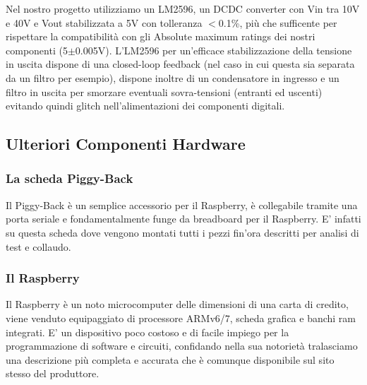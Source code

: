 \documentclass[10pt]{article}
\begin{document}
		Nel nostro progetto utilizziamo un LM2596, un DCDC converter con Vin tra 10V e 40V e Vout stabilizzata a 5V con tolleranza \(<\)0.1\%, più che sufficente per rispettare la compatibilità con gli Absolute maximum ratings dei nostri componenti (5\(\pm\)0.005V).
		L'LM2596 per un'efficace stabilizzazione della tensione in uscita dispone di una closed-loop feedback (nel caso in cui questa sia separata da un filtro per esempio), dispone inoltre di un condensatore in ingresso e un filtro in uscita per smorzare eventuali sovra-tensioni (entranti ed uscenti) evitando quindi glitch nell'alimentazioni dei componenti digitali.

	\subsection{Ulteriori Componenti Hardware}
		\subsubsection{La scheda Piggy-Back}\label{sec:piggy}
	Il Piggy-Back è un semplice accessorio per il Raspberry, è collegabile tramite una porta seriale e fondamentalmente funge da breadboard per il Raspberry. E' infatti su questa scheda dove vengono montati tutti i pezzi fin'ora descritti per analisi di test e collaudo.

		\subsubsection{Il Raspberry}\label{sec:rasp}
	Il Raspberry è un noto microcomputer delle dimensioni di una carta di credito, viene venduto equipaggiato di processore ARMv6/7, scheda grafica e banchi ram integrati. E' un dispositivo poco costoso e di facile impiego per la programmazione di software e circuiti, confidando nella sua notorietà tralasciamo una descrizione più completa e accurata che è comunque disponibile sul sito stesso del produttore.
\end{document}
